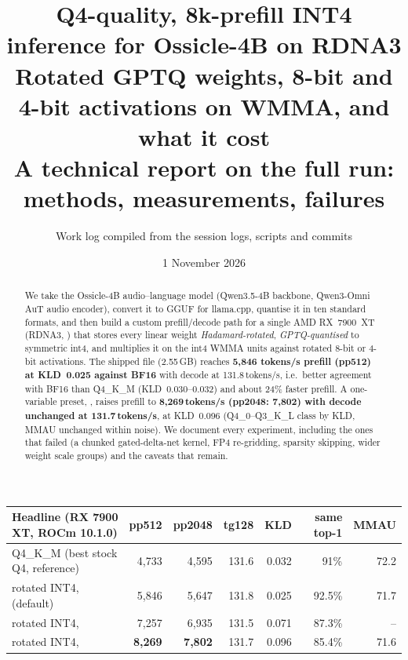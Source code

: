 \documentclass[10pt,a4paper]{article}
\title{\textbf{Q4-quality, 8k-prefill INT4 inference for Ossicle-4B on RDNA3}\\[2pt]
\large Rotated GPTQ weights, 8-bit and 4-bit activations on WMMA, and what it cost\\[-2pt]
\normalsize A technical report on the full run: methods, measurements, failures}
\author{Work log compiled from the session logs, scripts and commits}
\date{1 November 2026}
\newcommand{\tx}[1]{\texttt{\detokenize{#1}}}
\begin{document}
\maketitle
\thispagestyle{empty}

\begin{abstract}
\noindent
We take the Ossicle-4B audio--language model (Qwen3.5-4B backbone, Qwen3-Omni AuT audio encoder), convert it to GGUF for
llama.cpp, quantise it in ten standard formats, and then build a custom prefill/decode path for a single AMD RX~7900~XT
(RDNA3, \tx{gfx1100}) that stores every linear weight \emph{Hadamard-rotated}, \emph{GPTQ-quantised} to symmetric int4, and
multiplies it on the int4 WMMA units against rotated 8-bit or 4-bit activations.
The shipped file (2.55\,GB) reaches \textbf{5{,}846 tokens/s prefill (pp512) at KLD~0.025 against BF16} with decode at
131.8\,tokens/s, i.e.\ better agreement with BF16 than Q4\_K\_M (KLD~0.030--0.032) and about 24\% faster prefill.
A one-variable preset, \tx{GGML_INT4_PREFILL=fast}, raises prefill to \textbf{8{,}269\,tokens/s (pp2048: 7{,}802) with decode
unchanged at 131.7\,tokens/s}, at KLD~0.096 (Q4\_0--Q3\_K\_L class by KLD, MMAU unchanged within noise).
We document every experiment, including the ones that failed (a chunked gated-delta-net kernel, FP4 re-gridding, sparsity
skipping, wider weight scale groups) and the caveats that remain.
\end{abstract}

\vspace{4pt}
\begin{center}
\small
\begin{tabular}{@{}lrrrrrr@{}}
\toprule
\textbf{Headline (RX 7900 XT, ROCm 10.1.0)} & pp512 & pp2048 & tg128 & KLD & same top-1 & MMAU\\
\midrule
Q4\_K\_M (best stock Q4, reference) & 4{,}733 & 4{,}595 & 131.6 & 0.032 & 91\% & 72.2\\
rotated INT4, \tx{quality} (default) & 5{,}846 & 5{,}647 & 131.8 & 0.025 & 92.5\% & 71.7\\
rotated INT4, \tx{balanced} & 7{,}257 & 6{,}935 & 131.5 & 0.071 & 87.3\% & --\\
rotated INT4, \tx{fast} & \textbf{8{,}269} & \textbf{7{,}802} & 131.7 & 0.096 & 85.4\% & 71.6\\
\bottomrule
\end{tabular}
\end{center}

\tableofcontents
\newpage

\end{document}
